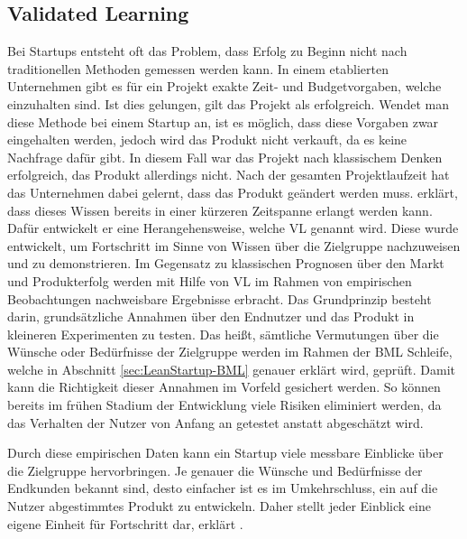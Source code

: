 \subsection*{\label{sec:LeanStartup-ValidatedLearning}\thesubsection\quad Validated Learning}
Bei Startups entsteht oft das Problem, dass Erfolg zu Beginn nicht nach traditionellen Methoden gemessen werden kann. In einem etablierten Unternehmen gibt es für ein Projekt exakte Zeit- und Budgetvorgaben, welche einzuhalten sind. Ist dies gelungen, gilt das Projekt als erfolgreich. Wendet man diese Methode bei einem Startup an, ist es möglich, dass diese Vorgaben zwar eingehalten werden, jedoch wird das Produkt nicht verkauft, da es keine Nachfrage dafür gibt. In diesem Fall war das Projekt nach klassischem Denken erfolgreich, das Produkt allerdings nicht. Nach der gesamten Projektlaufzeit hat das Unternehmen dabei gelernt, dass das Produkt geändert werden muss. \citeauthor{TheLeanStartup} erklärt, dass dieses Wissen bereits in einer kürzeren Zeitspanne erlangt werden kann. Dafür entwickelt er eine Herangehensweise, welche \ac{VL} genannt wird. Diese wurde entwickelt, um Fortschritt im Sinne von Wissen über die Zielgruppe nachzuweisen und zu demonstrieren. Im Gegensatz zu klassischen Prognosen über den Markt und Produkterfolg werden mit Hilfe von \ac{VL} im Rahmen von empirischen Beobachtungen nachweisbare Ergebnisse erbracht. Das Grundprinzip besteht darin, grundsätzliche Annahmen über den Endnutzer und das Produkt in kleineren Experimenten zu testen. Das heißt, sämtliche Vermutungen über die Wünsche oder Bedürfnisse der Zielgruppe werden im Rahmen der \ac{BML} Schleife, welche in Abschnitt \ref{sec:LeanStartup-BML} genauer erklärt wird, geprüft. Damit kann die Richtigkeit dieser Annahmen im Vorfeld gesichert werden. So können bereits im frühen Stadium der Entwicklung viele Risiken eliminiert werden, da das Verhalten der Nutzer von Anfang an getestet anstatt abgeschätzt wird.

Durch diese empirischen Daten kann ein Startup viele messbare Einblicke über die Zielgruppe hervorbringen. Je genauer die Wünsche und Bedürfnisse der Endkunden bekannt sind, desto einfacher ist es im Umkehrschluss, ein auf die Nutzer abgestimmtes Produkt zu entwickeln. Daher stellt jeder Einblick eine eigene Einheit für Fortschritt dar, erklärt \citeauthor{TheLeanStartup}.

